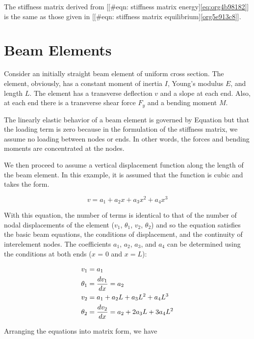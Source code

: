 \documentclass[a4paper,openany,12pt]{book}
\begin{document}
{{The stiffness matrix derived from [[\#eqn: stiffness matrix energy]\ref{eq:org4b98182}] is the same as those given in [[\#eqn: stiffness matrix equilibrium]\ref{org5e913c8}].

\section{Beam Elements}
\label{sec:org029b12d}
Consider an initially straight beam element of uniform cross section.
The element, obviously, has a constant moment of inertia \(I\), Young's
modulus \(E\), and length \(L\). The element has a transverse deflection \(v\)
and a slope at each end. Also, at each end there is a transverse shear
force \(F_y\) and a bending moment \(M\).

The linearly elastic behavior of a beam element is governed by Equation
but that the loading term is zero because in the formulation of the
stiffness matrix, we assume no loading between nodes or ends. In other
words, the forces and bending moments are concentrated at the nodes.

We then proceed to assume a vertical displacement function along the
length of the beam element. In this example, it is assumed that the
function is cubic and takes the form.

$$ v = a_1 + a_2x + a_3x^2 + a_4x^3$$

With this equation, the number of terms is identical to that of the
number of nodal displacements of the element (\(v_1\), \(\theta_1\), \(v_2\),
\(\theta_2\)) and so the equation satisfies the basic beam equations, the
conditions of displacement, and the continuity of interelement nodes.
The coefficients \(a_1\), \(a_2\), \(a_3\), and \(a_4\) can be determined using
the conditions at both ends (\(x\) = 0 and \(x = L\)):

\begin{gather*}
  v_1 = a_1 \hfill \\
  \theta _1 = \frac{dv_1}{dx} = a_2 \hfill \\
  v_2 = a_1 + a_2L + a_3L^2 + a_4L^3 \hfill \\
  \theta_2 = \frac{dv_2}{dx} = a_2 + 2a_3L + 3a_4L^2 \hfill \\ 
\end{gather*}

Arranging the equations into matrix form, we have

}}
\end{document}
